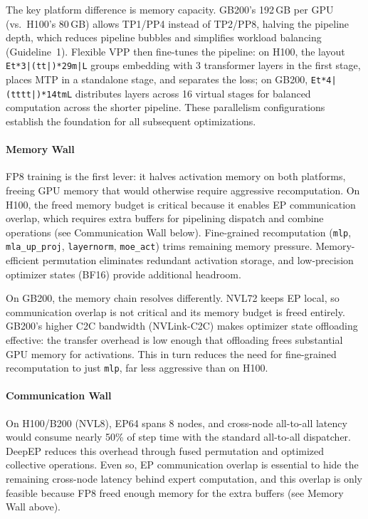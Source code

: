 The key platform difference is memory capacity. GB200's 192\,GB per GPU (vs.\ H100's 80\,GB) allows TP1/PP4 instead of TP2/PP8, halving the pipeline depth, which reduces pipeline bubbles and simplifies workload balancing (Guideline~1). Flexible VPP then fine-tunes the pipeline: on H100, the layout \texttt{Et*3|(tt|)*29m|L} groups embedding with 3 transformer layers in the first stage, places MTP in a standalone stage, and separates the loss; on GB200, \texttt{Et*4|(tttt|)*14tmL} distributes layers across 16 virtual stages for balanced computation across the shorter pipeline. These parallelism configurations establish the foundation for all subsequent optimizations.

\paragraph*{Memory Wall}
FP8 training is the first lever: it halves activation memory on both platforms, freeing GPU memory that would otherwise require aggressive recomputation. On H100, the freed memory budget is critical because it enables EP communication overlap, which requires extra buffers for pipelining dispatch and combine operations (see Communication Wall below). Fine-grained recomputation (\texttt{mlp}, \texttt{mla\_up\_proj}, \texttt{layernorm}, \texttt{moe\_act}) trims remaining memory pressure. Memory-efficient permutation eliminates redundant activation storage, and low-precision optimizer states (BF16) provide additional headroom.

On GB200, the memory chain resolves differently. NVL72 keeps EP local, so communication overlap is not critical and its memory budget is freed entirely. GB200's higher C2C bandwidth (NVLink-C2C) makes optimizer state offloading effective: the transfer overhead is low enough that offloading frees substantial GPU memory for activations. This in turn reduces the need for fine-grained recomputation to just \texttt{mlp}, far less aggressive than on H100.

\paragraph*{Communication Wall}
On H100/B200 (NVL8), EP64 spans 8 nodes, and cross-node all-to-all latency would consume nearly 50\% of step time with the standard all-to-all dispatcher. DeepEP reduces this overhead through fused permutation and optimized collective operations. Even so, EP communication overlap is essential to hide the remaining cross-node latency behind expert computation, and this overlap is only feasible because FP8 freed enough memory for the extra buffers (see Memory Wall above).

